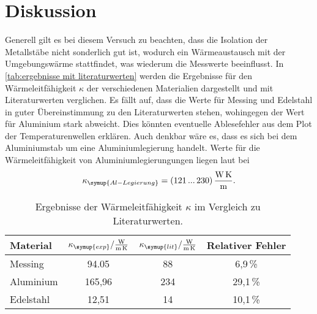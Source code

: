\section{Diskussion}
\label{sec:Diskussion}
Generell gilt es bei diesem Versuch zu beachten, dass die Isolation der Metallstäbe nicht sonderlich gut ist, wodurch ein Wärmeaustausch mit der 
Umgebungswärme stattfindet, was wiederum die Messwerte beeinflusst.
In \autoref{tab:ergebnisse mit literaturwerten} werden die Ergebnisse für den Wärmeleitfähigkeit $\kappa$ der verschiedenen Materialien 
dargestellt und mit Literaturwerten verglichen. Es fällt auf, dass die Werte für Messing und Edelstahl in guter Übereinstimmung 
zu den Literaturwerten stehen, wohingegen der Wert für Aluminium stark abweicht. Dies könnten eventuelle Ablesefehler aus dem Plot
der Temperaturenwellen erklären. Auch denkbar wäre es, dass es sich bei dem Aluminiumstab um eine Aluminiumlegierung handelt. Werte für
die Wärmeleitfähigkeit von Aluminiumlegierungungen liegen laut \cite{czichos} bei
\begin{equation}
    \kappa_{\symup{Al-Legierung}} = (121\,...\,230)\,\unit{\watt\per\metre\kelvin}.
\end{equation}
\begin{table} [H]
    \centering
    \caption{Ergebnisse der Wärmeleitfähigkeit $\kappa$ im Vergleich zu Literaturwerten.}
    \label{tab:ergebnisse mit literaturwerten}
    \begin{tabular}{l S[table-format=3.2] S[table-format=3.0] S[table-format=2.1]}
      \toprule
      {Material} & {$\kappa_{\symup{exp}} / \frac{\unit{\watt}}{\unit{\metre\kelvin}}$} &%
      {$\kappa_{\symup{lit}} / \frac{\unit{\watt}}{\unit{\metre\kelvin}}$} & {Relativer Fehler} \\
      \midrule
        Messing     & 94.05  & 88  & 6,9\,\% \\ 
        Aluminium   & 165,96 & 234 & 29,1\,\%\\
        Edelstahl   & 12,51  & 14  & 10,1\,\%\\
      \bottomrule
    \end{tabular}
  \end{table}